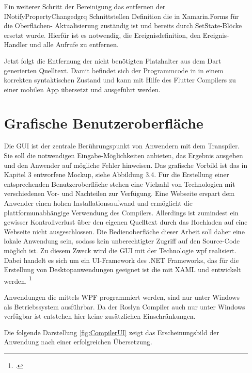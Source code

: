Ein weiterer Schritt der Bereinigung das entfernen der \glq INotifyPropertyChangedgrq{} Schnittstellen Definition die in Xamarin.Forms für die Oberflächen- Aktualisierung zuständig ist und bereits durch SetState-Blöcke ersetzt wurde.  Hierfür ist es notwendig,  die Ereignisdefinition, den Ereignis-Handler und alle Aufrufe zu entfernen.

Jetzt folgt die Entfernung der nicht benötigten Platzhalter aus dem Dart generierten Quelltext.  Damit befindet sich der Programmcode in in einem korrekten syntaktischen Zustand und kann mit Hilfe des Flutter Compilers zu einer mobilen App übersetzt und ausgeführt werden. 


\section{Grafische Benutzeroberfläche}
Die GUI ist der zentrale Berührungspunkt von Anwendern mit dem Transpiler.  Sie soll die notwendigen Eingabe-Möglichkeiten anbieten, das Ergebnis ausgeben und den Anwender auf mögliche Fehler hinweisen.  Das grafische Vorbild ist das in Kapitel 3 entworfene Mockup, siehe Abbildung 3.4.  Für die Erstellung einer entsprechenden Benutzeroberfläche stehen eine Vielzahl von Technologien mit verschiedenen Vor- und Nachteilen zur Verfügung. Eine Webseite erspart dem Anwender einen hohen Installationsaufwand und ermöglicht die plattformunabhängige Verwendung des Compilers.  Allerdings ist zumindest ein gewisser Kontrollverlust über den eigenen Quelltext durch das  Hochladen auf eine Webseite nicht ausgeschlossen.  Die Bedienoberfläche dieser Arbeit soll daher eine lokale Anwendung sein, sodass kein  unberechtigter Zugriff auf den Source-Code möglich ist.  Zu diesem Zweck wird die GUI mit der Technologie \ac{wpf} realisiert.  Dabei handelt es sich um ein UI-Framework des .NET Frameworks, das für die Erstellung von Desktopanwendungen geeignet ist die mit XAML und \Csharp entwickelt werden. \footcite[Vgl.][S. 1f]{Wenger2012} 

Anwendungen die mittels WPF programmiert werden, sind nur unter Windows als Betriebssystem ausführbar.  Da der Roslyn Compiler auch nur unter Windows verfügbar ist entstehen hier keine zusätzlichen Einschränkungen. 

Die folgende Darstellung \ref{fig:CompilerUI} zeigt das Erscheinungsbild der Anwendung nach einer erfolgreichen Übersetzung.

